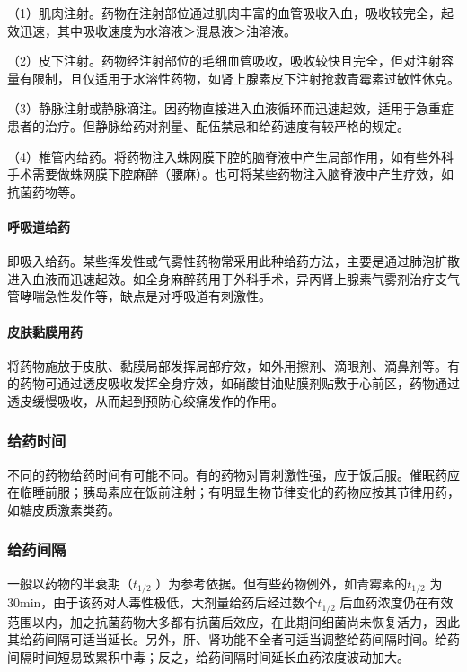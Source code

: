 （1）肌肉注射。药物在注射部位通过肌肉丰富的血管吸收入血，吸收较完全，起效迅速，其中吸收速度为水溶液＞混悬液＞油溶液。

（2）皮下注射。药物经注射部位的毛细血管吸收，吸收较快且完全，但对注射容量有限制，且仅适用于水溶性药物，如肾上腺素皮下注射抢救青霉素过敏性休克。

（3）静脉注射或静脉滴注。因药物直接进入血液循环而迅速起效，适用于急重症患者的治疗。但静脉给药对剂量、配伍禁忌和给药速度有较严格的规定。

（4）椎管内给药。将药物注入蛛网膜下腔的脑脊液中产生局部作用，如有些外科手术需要做蛛网膜下腔麻醉（腰麻）。也可将某些药物注入脑脊液中产生疗效，如抗菌药物等。
\paragraph{呼吸道给药}

即吸入给药。某些挥发性或气雾性药物常采用此种给药方法，主要是通过肺泡扩散进入血液而迅速起效。如全身麻醉药用于外科手术，异丙肾上腺素气雾剂治疗支气管哮喘急性发作等，缺点是对呼吸道有刺激性。
\paragraph{皮肤黏膜用药}

将药物施放于皮肤、黏膜局部发挥局部疗效，如外用擦剂、滴眼剂、滴鼻剂等。有的药物可通过透皮吸收发挥全身疗效，如硝酸甘油贴膜剂贴敷于心前区，药物通过透皮缓慢吸收，从而起到预防心绞痛发作的作用。

\subsubsection{给药时间}

不同的药物给药时间有可能不同。有的药物对胃刺激性强，应于饭后服。催眠药应在临睡前服；胰岛素应在饭前注射；有明显生物节律变化的药物应按其节律用药，如糖皮质激素类药。

\subsubsection{给药间隔}

一般以药物的半衰期（$t_{1/2}$
）为参考依据。但有些药物例外，如青霉素的$t_{1/2}$
为30min，由于该药对人毒性极低，大剂量给药后经过数个$t_{1/2}$
后血药浓度仍在有效范围以内，加之抗菌药物大多都有抗菌后效应，在此期间细菌尚未恢复活力，因此其给药间隔可适当延长。另外，肝、肾功能不全者可适当调整给药间隔时间。给药间隔时间短易致累积中毒；反之，给药间隔时间延长血药浓度波动加大。

